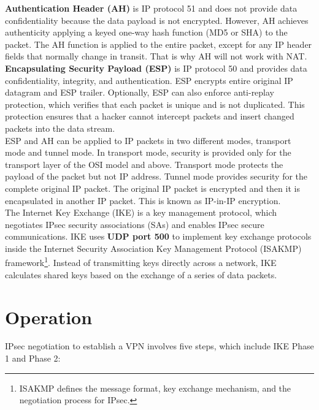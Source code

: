 \textbf{Authentication Header (AH)} is IP protocol 51 and does not provide data confidentiality because the data payload is not encrypted. However, AH achieves authenticity applying a keyed one-way hash function (MD5 or SHA) to the packet. The AH function is applied to the entire packet, except for any IP header fields that normally change in transit. That is why AH will not work with NAT.\\

\textbf{Encapsulating Security Payload (ESP)} is IP protocol 50 and provides data confidentiality, integrity, and authentication. ESP encrypts entire original IP datagram and ESP trailer. Optionally, ESP can also enforce anti-replay protection, which verifies that each packet is unique and is not duplicated. This protection ensures that a hacker cannot intercept packets and insert changed packets into the data stream.\\

ESP and AH can be applied to IP packets in two different modes, transport mode and tunnel mode. In transport mode, security is provided only for the transport layer of the OSI model and above. Transport mode protects the payload of the packet but not IP address. Tunnel mode provides security for the complete original IP packet. The original IP packet is encrypted and then it is encapsulated in another IP packet. This is known as IP-in-IP encryption. \\

The Internet Key Exchange (IKE) is a key management protocol, which negotiates IPsec security associations (SAs) and enables IPsec secure communications. IKE uses \textbf{UDP port 500} to implement key exchange protocols inside the Internet Security Association Key Management Protocol (ISAKMP) framework\footnote{ISAKMP defines the message format, key exchange mechanism, and the negotiation process for IPsec.}. Instead of transmitting keys directly across a network, IKE calculates shared keys based on the exchange of a series of data packets. 

\section{Operation}

IPsec negotiation to establish a VPN involves five steps, which include IKE Phase 1 and Phase 2:

